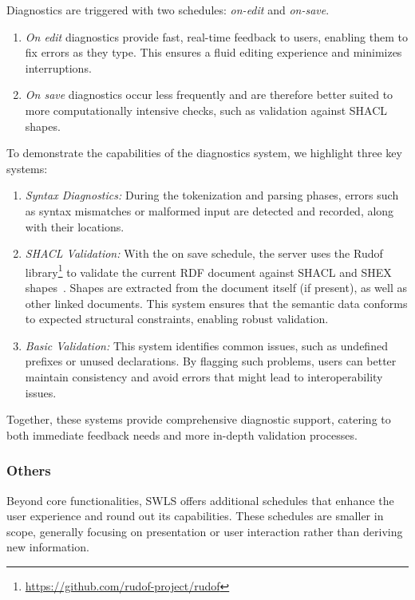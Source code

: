 Diagnostics are triggered with two schedules: \textit{on-edit} and \textit{on-save}.

\begin{enumerate}
  \item \textit{On edit} diagnostics provide fast, real-time feedback to users, enabling them to fix errors as they type. 
    This ensures a fluid editing experience and minimizes interruptions.
  \item \textit{On save} diagnostics occur less frequently and are therefore better suited to more computationally intensive checks,
   such as validation against SHACL shapes.
\end{enumerate}

To demonstrate the capabilities of the diagnostics system, we highlight three key systems:

\begin{enumerate}
  \item \textit{Syntax Diagnostics:}
    During the tokenization and parsing phases, errors such as syntax mismatches or malformed input are detected and recorded, along with their locations.
  \item \textit{SHACL Validation:} 
    With the on save schedule, the server uses the Rudof library\footnote{\url{https://github.com/rudof-project/rudof}} to validate the current RDF document against SHACL and SHEX shapes~\cite{labra2022rudof}.
    Shapes are extracted from the document itself (if present), as well as other linked documents.
    This system ensures that the semantic data conforms to expected structural constraints, enabling robust validation.
  \item \textit{Basic Validation:}
    This system identifies common issues, such as undefined prefixes or unused declarations.
    By flagging such problems, users can better maintain consistency and avoid errors that might lead to interoperability issues.
\end{enumerate}

Together, these systems provide comprehensive diagnostic support, catering to both immediate feedback needs and more in-depth validation processes.

\subsubsection{Others}

Beyond core functionalities, SWLS offers additional schedules that enhance the user experience and round out its capabilities.
These schedules are smaller in scope, generally focusing on presentation or user interaction rather than deriving new information.


